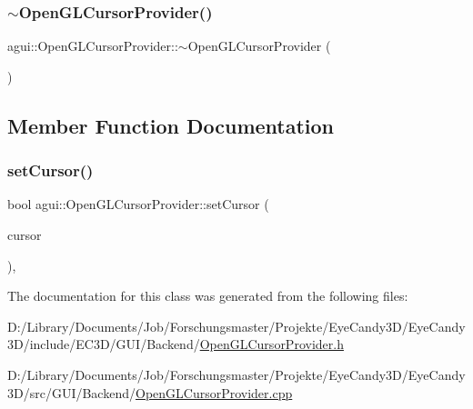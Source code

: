 \subsubsection{\texorpdfstring{$\sim$\+Open\+G\+L\+Cursor\+Provider()}{~OpenGLCursorProvider()}}
{\footnotesize\ttfamily agui\+::\+Open\+G\+L\+Cursor\+Provider\+::$\sim$\+Open\+G\+L\+Cursor\+Provider (\begin{DoxyParamCaption}{ }\end{DoxyParamCaption})\hspace{0.3cm}{\ttfamily [virtual]}}



\subsection{Member Function Documentation}
\mbox{\label{classagui_1_1_open_g_l_cursor_provider_a1a01c10c941263b5deaf339a86c80b31}} 
\subsubsection{\texorpdfstring{set\+Cursor()}{setCursor()}}
{\footnotesize\ttfamily bool agui\+::\+Open\+G\+L\+Cursor\+Provider\+::set\+Cursor (\begin{DoxyParamCaption}\item[{Cursor\+Enum}]{cursor }\end{DoxyParamCaption})\hspace{0.3cm}{\ttfamily [override]}, {\ttfamily [virtual]}}



The documentation for this class was generated from the following files\+:\begin{DoxyCompactItemize}
\item 
D\+:/\+Library/\+Documents/\+Job/\+Forschungsmaster/\+Projekte/\+Eye\+Candy3\+D/\+Eye\+Candy3\+D/include/\+E\+C3\+D/\+G\+U\+I/\+Backend/\mbox{\hyperlink{_open_g_l_cursor_provider_8h}{Open\+G\+L\+Cursor\+Provider.\+h}}\item 
D\+:/\+Library/\+Documents/\+Job/\+Forschungsmaster/\+Projekte/\+Eye\+Candy3\+D/\+Eye\+Candy3\+D/src/\+G\+U\+I/\+Backend/\mbox{\hyperlink{_open_g_l_cursor_provider_8cpp}{Open\+G\+L\+Cursor\+Provider.\+cpp}}\end{DoxyCompactItemize}

